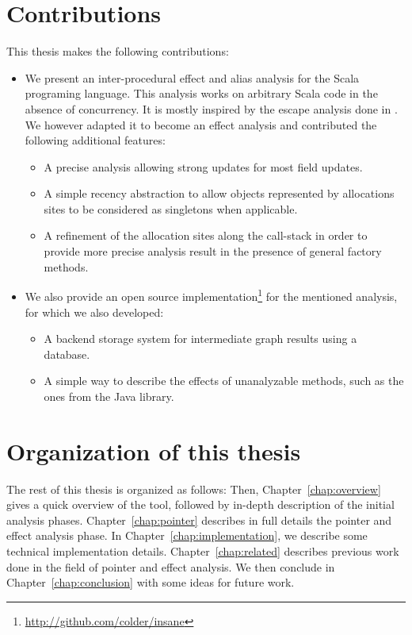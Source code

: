\section{Contributions}
This thesis makes the following contributions:
\begin{itemize}
    \item
    We present an inter-procedural effect and alias analysis for the Scala
    programing language. This analysis works on arbitrary Scala code in the
    absence of concurrency. It is mostly inspired by the escape analysis done
    in \cite{}. We however adapted it to become an effect analysis and
    contributed the following additional features:
    \begin{itemize}
        \item A precise analysis allowing strong updates for most field
        updates.
        \item A simple recency abstraction to allow objects represented by
        allocations sites to be considered as singletons when applicable.
        \item A refinement of the allocation
        sites\cite{DBLP:conf/pldi/ChaseWZ90} along the call-stack in
        order to provide more precise analysis result in the presence of
        general factory methods.
    \end{itemize}

    \item We also provide an open source
    implementation\footnote{\url{http://github.com/colder/insane}} for the
    mentioned analysis, for which we also developed:
    \begin{itemize}
        \item A backend storage system for intermediate graph results using a
        database.
        \item A simple way to describe the effects of unanalyzable methods, such
        as the ones from the Java library.
    \end{itemize}
\end{itemize}

\section{Organization of this thesis}
The rest of this thesis is organized as follows: Then,
Chapter~\ref{chap:overview} gives a quick overview of the tool, followed by
in-depth description of the initial analysis phases.
Chapter~\ref{chap:pointer} describes in full details the pointer and effect
analysis phase.  In Chapter~\ref{chap:implementation}, we describe some
technical implementation details. Chapter~\ref{chap:related} describes previous
work done in the field of pointer and effect analysis. We then conclude in
Chapter~\ref{chap:conclusion} with some ideas for future work.
